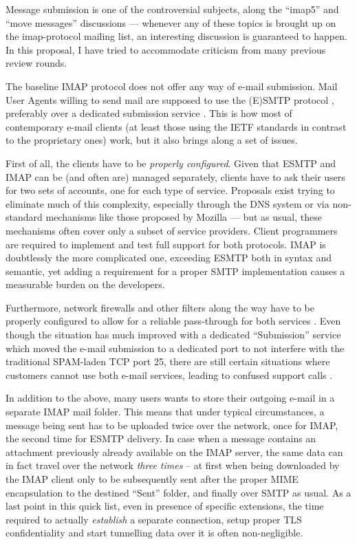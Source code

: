 \documentclass[trojita]{subfiles}
\begin{document}
Message submission is one of the controversial subjects, along the ``imap5'' and ``move messages'' discussions ---
whenever any of these topics is brought up on the imap-protocol mailing list, an interesting discussion is guaranteed to
happen.  In this proposal, I have tried to accommodate criticism from many previous review rounds.

The baseline IMAP protocol does not offer any way of e-mail submission.  Mail User Agents willing to send mail are
supposed to use the (E)SMTP protocol \cite{rfc5321} \cite{rfc2821}, preferably over a dedicated submission service
\cite{rfc6409}.  This is how most of contemporary e-mail clients (at least those using the IETF standards in contrast
to the proprietary ones) work, but it also brings along a set of issues.

First of all, the clients have to be {\em properly configured}.  Given that ESMTP and IMAP can be (and often are)
managed separately, clients have to ask their users for two sets of accounts, one for each type of service.  Proposals
exist trying to eliminate much of this complexity, especially through the DNS system \cite{rfc6186} or via non-standard
mechanisms like those proposed by Mozilla \cite{mozilla-ispdb} --- but as usual, these mechanisms often cover only a
subset of service providers.  Client programmers are required to implement and test full support for both protocols.
IMAP is doubtlessly the more complicated one, exceeding ESMTP both in syntax and semantic, yet adding a requirement for
a proper SMTP implementation causes a measurable burden on the developers.

Furthermore, network firewalls and other filters along the way have to be properly configured to allow for a reliable
pass-through for both services \cite{crocker-beep-multi-conns}.  Even though the situation has much improved with a
dedicated ``Submission'' service \cite{rfc6409} which moved the e-mail submission to a dedicated port to not interfere
with the traditional SPAM-laden TCP port 25, there are still certain situations where customers cannot use both e-mail
services, leading to confused support calls \cite{submission-users-suck-smtp-imap} \cite{panozzo-submission-users-suck}.

In addition to the above, many users wants to store their outgoing e-mail in a separate IMAP mail folder.  This means
that under typical circumstances, a message being sent has to be uploaded twice over the network, once for IMAP, the
second time for ESMTP delivery.  In case when a message contains an attachment previously already available on the IMAP
server, the same data can in fact travel over the network {\em three times} -- at first when being downloaded by the
IMAP client only to be subsequently sent after the proper MIME encapsulation to the destined ``Sent'' folder, and
finally over SMTP as usual.  As a last point in this quick list, even in presence of specific extensions, the time
required to actually {\em establish} a separate connection, setup proper TLS confidentiality and start tunnelling data
over it is often non-negligible.
\end{document}
